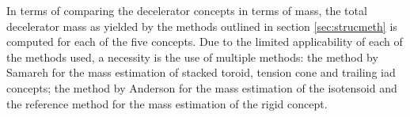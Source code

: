 In terms of comparing the decelerator concepts in terms of mass, the total decelerator mass as yielded by the methods outlined in section \ref{sec:strucmeth} is computed for each of the five concepts. Due to the limited applicability of each of the methods used, a necessity is the use of multiple methods: the method by Samareh \cite{Samareh2011} for the mass estimation of stacked toroid, tension cone and trailing \gls{iad} concepts; the method by Anderson \cite{Anderson1969} for the mass estimation of the isotensoid and the reference method for the mass estimation of the rigid concept. 

